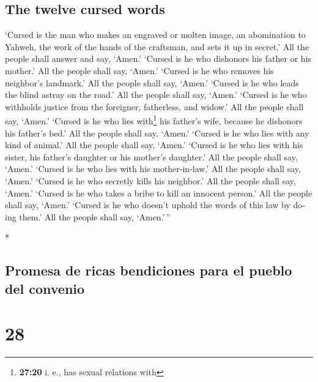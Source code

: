 \begin{paracol}{2}
\begin{otherlanguage}{english}
\hypertarget{the-twelve-cursed-words}{%
\subsection{The twelve cursed words}\label{the-twelve-cursed-words}}

 `Cursed is the man who makes an engraved or molten
image, an abomination to Yahweh, the work of the hands of the craftsman,
and sets it up in secret.' All the people shall answer and say, `Amen.'
 `Cursed is he who dishonors his father or his mother.'
All the people shall say, `Amen.'  `Cursed is he who
removes his neighbor's landmark.' All the people shall say, `Amen.'
 `Cursed is he who leads the blind astray on the road.'
All the people shall say, `Amen.'  `Cursed is he who
withholds justice from the foreigner, fatherless, and widow.' All the
people shall say, `Amen.'  `Cursed is he who lies
with\footnote{\textbf{27:20} i. e., has sexual relations with} his
father's wife, because he dishonors his father's bed.' All the people
shall say, `Amen.'  `Cursed is he who lies with any kind
of animal.' All the people shall say, `Amen.'  `Cursed is
he who lies with his sister, his father's daughter or his mother's
daughter.' All the people shall say, `Amen.'  `Cursed is
he who lies with his mother-in-law.' All the people shall say, `Amen.'
 `Cursed is he who secretly kills his neighbor.' All the
people shall say, `Amen.'  `Cursed is he who takes a
bribe to kill an innocent person.' All the people shall say, `Amen.'
 `Cursed is he who doesn't uphold the words of this law
by doing them.' All the people shall say, `Amen.'\,''

\end{otherlanguage}

\switchcolumn[0]*

\hypertarget{promesa-de-ricas-bendiciones-para-el-pueblo-del-convenio}{%
\subsection{Promesa de ricas bendiciones para el pueblo del
convenio}\label{promesa-de-ricas-bendiciones-para-el-pueblo-del-convenio}}

\hypertarget{section-54}{%
\section{28}\label{section-54}}


\end{paracol}
